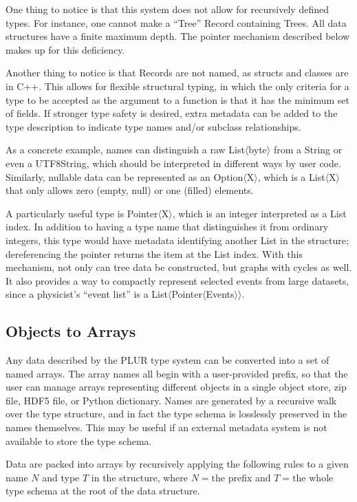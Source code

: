 \documentclass[10pt, conference, compsocconf]{IEEEtran}
\begin{document}
One thing to notice is that this system does not allow for recursively defined types. For instance, one cannot make a ``Tree'' Record containing Trees. All data structures have a finite maximum depth. The pointer mechanism described below makes up for this deficiency.

Another thing to notice is that Records are not named, as structs and classes are in C++. This allows for flexible structural typing, in which the only criteria for a type to be accepted as the argument to a function is that it has the minimum set of fields. If stronger type safety is desired, extra metadata can be added to the type description to indicate type names and/or subclass relationships.

As a concrete example, names can distinguish a raw List$\langle$byte$\rangle$ from a String or even a UTF8String, which should be interpreted in different ways by user code. Similarly, nullable data can be represented as an Option$\langle$X$\rangle$, which is a List$\langle$X$\rangle$ that only allows zero (empty, null) or one (filled) elements.

A particularly useful type is Pointer$\langle$X$\rangle$, which is an integer interpreted as a List index. In addition to having a type name that distinguishes it from ordinary integers, this type would have metadata identifying another List in the structure; dereferencing the pointer returns the item at the List index. With this mechanism, not only can tree data be constructed, but graphs with cycles as well. It also provides a way to compactly represent selected events from large datasets, since a physicist's ``event list'' is a List$\langle$Pointer$\langle$Events$\rangle\rangle$.

\subsection{Objects to Arrays}

Any data described by the PLUR type system can be converted into a set of named arrays. The array names all begin with a user-provided prefix, so that the user can manage arrays representing different objects in a single object store, zip file, HDF5 file, or Python dictionary. Names are generated by a recursive walk over the type structure, and in fact the type schema is losslessly preserved in the names themselves. This may be useful if an external metadata system is not available to store the type schema.

Data are packed into arrays by recursively applying the following rules to a given name $N$ and type $T$ in the structure, where $N = \mbox{the}$ prefix and $T = \mbox{the}$ whole type schema at the root of the data structure.
\end{document}
